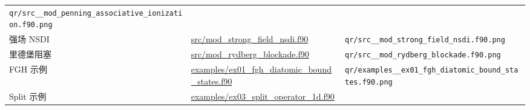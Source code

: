 \documentclass[
]{ctexbook}
\begin{document}
\begin{longtable}[]{@{}lll@{}}
\begin{minipage}[t]{0.30\columnwidth}
\texttt{qr/src\_\_mod\_penning\_associative\_ionization.f90.png}\strut
\end{minipage}\tabularnewline
\begin{minipage}[t]{0.30\columnwidth}\raggedright
强场 NSDI\strut
\end{minipage} & \begin{minipage}[t]{0.30\columnwidth}\raggedright
\href{https://github.com/l1Ha/QuantumGeneralModule/blob/main/src/mod_strong_field_nsdi.f90}{src/mod\_strong\_field\_nsdi.f90}\strut
\end{minipage} & \begin{minipage}[t]{0.30\columnwidth}\raggedright
\texttt{qr/src\_\_mod\_strong\_field\_nsdi.f90.png}\strut
\end{minipage}\tabularnewline
\begin{minipage}[t]{0.30\columnwidth}\raggedright
里德堡阻塞\strut
\end{minipage} & \begin{minipage}[t]{0.30\columnwidth}\raggedright
\href{https://github.com/l1Ha/QuantumGeneralModule/blob/main/src/mod_rydberg_blockade.f90}{src/mod\_rydberg\_blockade.f90}\strut
\end{minipage} & \begin{minipage}[t]{0.30\columnwidth}\raggedright
\texttt{qr/src\_\_mod\_rydberg\_blockade.f90.png}\strut
\end{minipage}\tabularnewline
\begin{minipage}[t]{0.30\columnwidth}\raggedright
FGH 示例\strut
\end{minipage} & \begin{minipage}[t]{0.30\columnwidth}\raggedright
\href{https://github.com/l1Ha/QuantumGeneralModule/blob/main/examples/ex01_fgh_diatomic_bound_states.f90}{examples/ex01\_fgh\_diatomic\_bound\_states.f90}\strut
\end{minipage} & \begin{minipage}[t]{0.30\columnwidth}\raggedright
\texttt{qr/examples\_\_ex01\_fgh\_diatomic\_bound\_states.f90.png}\strut
\end{minipage}\tabularnewline
\begin{minipage}[t]{0.30\columnwidth}\raggedright
Split 示例\strut
\end{minipage} & \begin{minipage}[t]{0.30\columnwidth}\raggedright
\href{https://github.com/l1Ha/QuantumGeneralModule/blob/main/examples/ex03_split_operator_1d.f90}{examples/ex03\_split\_operator\_1d.f90}\strut
\end{minipage} & \begin{minipage}[t]{0.30\columnwidth}\raggedright

\end{minipage}
\end{longtable}
\end{document}
